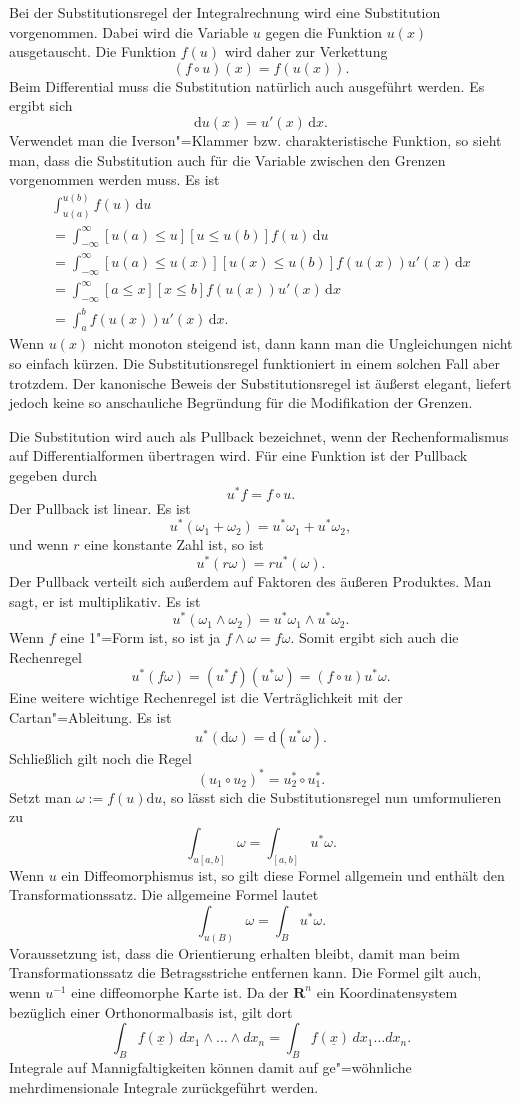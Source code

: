 \documentclass[a4paper,10pt,fleqn,twocolumn,twoside]{article}
\begin{document}
Bei der Substitutionsregel der Integralrechnung wird eine
Substitution vorgenommen. Dabei wird die Variable $u$ gegen die Funktion
$u(x)$ ausgetauscht. Die Funktion $f(u)$ wird daher zur
Verkettung
\[(f\circ u)(x) = f(u(x)).\]
Beim Differential muss die Substitution natürlich auch ausgeführt
werden. Es ergibt sich
\[\mathrm du(x) = u'(x)\,\mathrm dx.\]
Verwendet man die Iverson"=Klammer bzw. charakteristische Funktion,
so sieht man, dass die Substitution auch für die Variable zwischen
den Grenzen vorgenommen werden muss. Es ist
\begin{gather*}
\int_{u(a)}^{u(b)} f(u)\,\mathrm du\\
= \int_{-\infty}^{\infty} [u(a)\le u][u\le u(b)] f(u)\,\mathrm du\\
= \int_{-\infty}^{\infty} [u(a)\le u(x)][u(x) \le u(b)] f(u(x))u'(x)\,\mathrm dx\\
= \int_{-\infty}^{\infty} [a\le x][x\le b] f(u(x)) u'(x)\,\mathrm dx\\
= \int_a^b f(u(x))u'(x)\,\mathrm dx.
\end{gather*}
Wenn $u(x)$ nicht monoton steigend ist, dann kann man die
Ungleichungen nicht so einfach kürzen. Die Substitutionsregel
funktioniert in einem solchen Fall aber trotzdem. Der kanonische
Beweis der Substitutionsregel ist äußerst elegant, liefert jedoch
keine so anschauliche Begründung für die Modifikation der Grenzen.

Die Substitution wird auch als Pullback bezeichnet, wenn der
Rechenformalismus auf Differentialformen übertragen wird. Für
eine Funktion ist der Pullback gegeben durch
\[u^{*}f = f\circ u.\]
Der Pullback ist linear. Es ist
\[u^{*}(\omega_1+\omega_2)
= u^{*}\omega_1+u^{*}\omega_2,\]
und wenn $r$ eine konstante Zahl ist, so ist
\[u^{*}(r\omega) = ru^{*}(\omega).\]
Der Pullback verteilt sich außerdem auf Faktoren des
äußeren Produktes. Man sagt, er ist multiplikativ. Es ist
\[u^{*}(\omega_1\wedge\omega_2)
= u^{*}\omega_1\wedge u^{*}\omega_2.\]
Wenn $f$ eine 1"=Form ist, so ist ja $f\wedge\omega = f\omega.$
Somit ergibt sich auch die Rechenregel
\[u^{*}(f\omega) = (u^{*}f)(u^{*}\omega)
= (f\circ u)u^{*}\omega.\] 
Eine weitere wichtige Rechenregel ist die Verträglichkeit
mit der Cartan"=Ableitung. Es ist
\[u^{*}(\mathrm d\omega) = \mathrm d(u^{*}\omega).\]
Schließlich gilt noch die Regel
\[(u_1\circ u_2)^{*} = u_2^{*}\circ u_1^{*}.\]
Setzt man $\omega:=f(u)\mathrm du$, so lässt sich die
Substitutionsregel nun umformulieren zu
\[\int_{u[a,b]} \omega = \int_{[a,b]} u^{*}\omega.\]
Wenn $u$ ein Diffeomorphismus ist, so gilt diese Formel
allgemein und enthält den Transformationssatz. Die allgemeine Formel
lautet
\[\int_{u(B)} \omega = \int_{B} u^{*}\omega.\]
Voraussetzung ist, dass die Orientierung erhalten bleibt, damit man
beim Transformationssatz die Betragsstriche entfernen kann.
Die Formel gilt auch, wenn $u^{-1}$ eine diffeomorphe Karte ist.
Da der $\mathbf R^n$ ein Koordinatensystem bezüglich einer
Orthonormalbasis ist, gilt dort
\[\int_B f(\underline x)\, dx_1\wedge\ldots\wedge dx_n
= \int_B f(\underline x)\, dx_1\ldots dx_n.\]
Integrale auf Mannigfaltigkeiten können damit auf ge"=wöhnliche
mehrdimensionale Integrale zurückgeführt werden.
\end{document}
